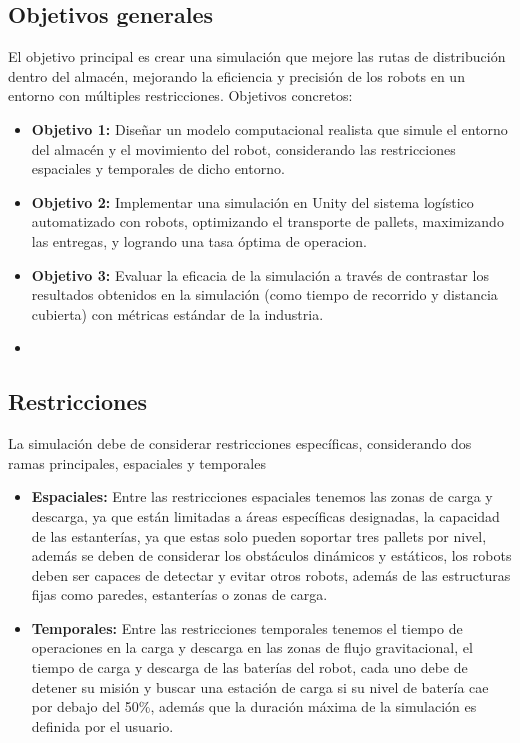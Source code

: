 \documentclass[sjournal]{IEEEtran}
\begin{document}
\subsection{Objetivos generales}
El objetivo principal es crear una simulación que mejore las rutas de distribución dentro del almacén, mejorando la eficiencia y precisión de los robots en un entorno con múltiples restricciones. Objetivos concretos:
\begin{itemize}
    \item \textbf{Objetivo 1:} Diseñar un modelo computacional realista que simule el entorno del almacén y el movimiento del robot, considerando las restricciones espaciales y temporales de dicho entorno.
    \item \textbf{Objetivo 2:} Implementar una simulación en Unity del sistema logístico automatizado con robots, optimizando el transporte de pallets, maximizando las entregas, y logrando una tasa óptima de operacion. 
    \item \textbf{Objetivo 3: }Evaluar la eficacia de la simulación a través de contrastar los resultados obtenidos en la simulación (como tiempo de recorrido y distancia cubierta) con métricas estándar de la industria.
    \item 
\end{itemize}

\subsection{Restricciones}
La simulación debe de considerar restricciones específicas, considerando dos ramas principales, espaciales y temporales
\begin{itemize}
    \item \textbf{Espaciales:} Entre las restricciones espaciales tenemos las zonas de carga y descarga, ya que están limitadas a áreas específicas designadas, la capacidad de las estanterías, ya que estas solo pueden soportar tres pallets por nivel, además se deben de considerar los obstáculos dinámicos y estáticos, los robots deben ser capaces de detectar y evitar otros robots, además de las estructuras fijas como paredes, estanterías o zonas de carga.
    
    \item \textbf{Temporales:} Entre las restricciones temporales tenemos el tiempo de operaciones en la carga y descarga en las zonas de flujo gravitacional, el tiempo de carga y descarga de las baterías del robot, cada uno debe de detener su misión y buscar una estación de carga si su nivel de batería cae por debajo del 50\%, además que la duración máxima de la simulación es definida por el usuario.
\end{itemize}
\end{document}
